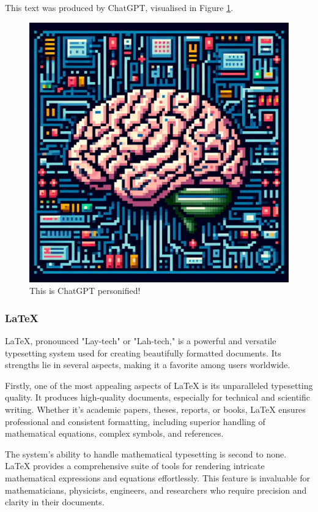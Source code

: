 \documentclass[twocolumn, 9pt]{extarticle}
\begin{document}
This text was produced by ChatGPT, visualised in Figure \ref{fig:chatgpt}.



\begin{figure}[ht]
\centering
\includegraphics[width=0.99\linewidth]{AI.jpeg}
\caption{\label{fig:chatgpt}This is ChatGPT personified!}
\end{figure}

\subsubsection{LaTeX}

LaTeX, pronounced "Lay-tech" or "Lah-tech," is a powerful and versatile typesetting system used for creating beautifully formatted documents. Its strengths lie in several aspects, making it a favorite among users worldwide.

Firstly, one of the most appealing aspects of LaTeX is its unparalleled typesetting quality. It produces high-quality documents, especially for technical and scientific writing. Whether it's academic papers, theses, reports, or books, LaTeX ensures professional and consistent formatting, including superior handling of mathematical equations, complex symbols, and references.

The system's ability to handle mathematical typesetting is second to none. LaTeX provides a comprehensive suite of tools for rendering intricate mathematical expressions and equations effortlessly. This feature is invaluable for mathematicians, physicists, engineers, and researchers who require precision and clarity in their documents.
\end{document}
